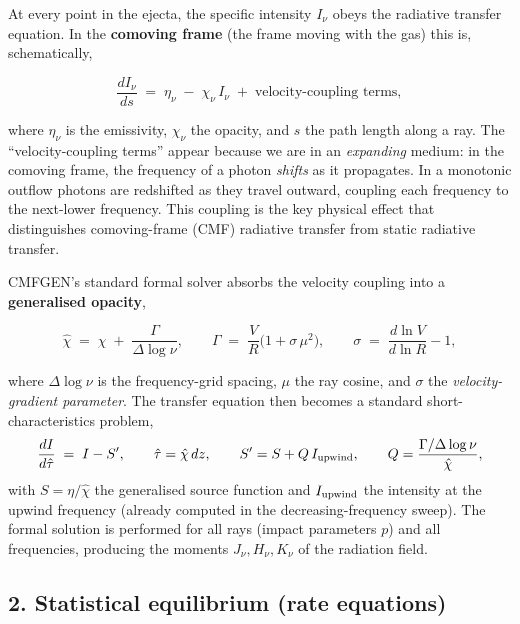 \documentclass[11pt]{article}
\begin{document}
At every point in the ejecta, the specific intensity $I_\nu$ obeys the
radiative transfer equation.  In the \textbf{comoving frame} (the frame
moving with the gas) this is, schematically,

\begin{equation}
  \frac{d I_\nu}{d s}
  \;=\; \eta_\nu \;-\; \chi_\nu\, I_\nu
  \;+\; \text{velocity-coupling terms},
\end{equation}

where $\eta_\nu$ is the emissivity, $\chi_\nu$ the opacity, and $s$ the
path length along a ray.  The ``velocity-coupling terms'' appear because
we are in an \emph{expanding} medium: in the comoving frame, the
frequency of a photon \emph{shifts} as it propagates.  In a monotonic
outflow photons are redshifted as they travel outward, coupling each
frequency to the next-lower frequency.  This coupling is the key
physical effect that distinguishes comoving-frame (CMF) radiative
transfer from static radiative transfer.

CMFGEN's standard formal solver absorbs the velocity coupling into a
\textbf{generalised opacity},

\begin{equation}
  \hat\chi \;=\; \chi \;+\; \frac{\Gamma}{\Delta\log\nu},
  \qquad
  \Gamma \;=\; \frac{V}{R}\bigl(1 + \sigma\,\mu^{2}\bigr),
  \qquad
  \sigma \;=\; \frac{d\ln V}{d\ln R} - 1,
\end{equation}

where $\Delta\log\nu$ is the frequency-grid spacing, $\mu$ the ray
cosine, and $\sigma$ the \emph{velocity-gradient parameter}.  The
transfer equation then becomes a standard short-characteristics problem,
\begin{equation}
  \frac{d I}{d\hat\tau} \;=\; I - S',
  \qquad
  \hat\tau = \hat\chi\, dz,
  \qquad
  S' = S + Q\, I_{\rm upwind},
  \qquad
  Q = \frac{\Gamma/\Delta\log\nu}{\hat\chi},
\end{equation}
with $S = \eta/\hat\chi$ the generalised source function and
$I_{\rm upwind}$ the intensity at the upwind frequency (already computed
in the decreasing-frequency sweep).  The formal solution is performed
for all rays (impact parameters $p$) and all frequencies, producing the
moments $J_\nu, H_\nu, K_\nu$ of the radiation field.

\subsection{2. Statistical equilibrium (rate equations)}
\end{document}
